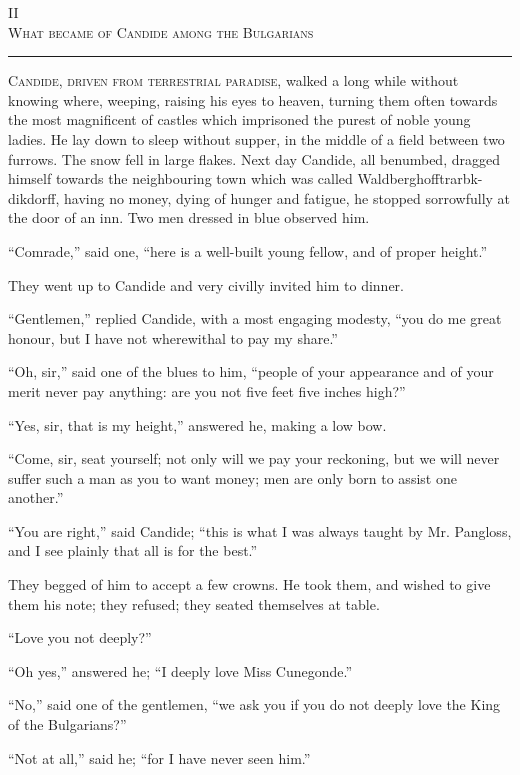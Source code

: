 \begin{center}
II\\
\textsc{What became of Candide among the Bulgarians}
\end{center}
\vspace{-0.5cm}
\rule{\textwidth}{0.5pt}
\lettrine{C}{andide, driven from terrestrial paradise}, walked a long while without knowing where, weeping, raising his eyes to heaven, turning them often towards the most magnificent of castles which imprisoned the purest of noble young ladies. He lay down to sleep without supper, in the middle of a field between two furrows. The snow fell in large flakes. Next day Candide, all benumbed, dragged himself towards the neighbouring town which was called Waldberghofftrarbk-dikdorff, having no money, dying of hunger and fatigue, he stopped sorrowfully at the door of an inn. Two men dressed in blue observed him.

``Comrade,'' said one, ``here is a well-built young fellow, and of proper height.''

They went up to Candide and very civilly invited him to dinner.

``Gentlemen,'' replied Candide, with a most engaging modesty, ``you do me great honour, but I have not wherewithal to pay my share.''

``Oh, sir,'' said one of the blues to him, ``people of your appearance and of your merit never pay anything: are you not five feet five inches high?''

``Yes, sir, that is my height,'' answered he, making a low bow.

``Come, sir, seat yourself; not only will we pay your reckoning, but we will never suffer such a man as you to want money; men are only born to assist one another.''

``You are right,'' said Candide; ``this is what I was always taught by Mr. Pangloss, and I see plainly that all is for the best.''

They begged of him to accept a few crowns. He took them, and wished to give them his note; they refused; they seated themselves at table.

``Love you not deeply?''

``Oh yes,'' answered he; ``I deeply love Miss Cunegonde.''

``No,'' said one of the gentlemen, ``we ask you if you do not deeply love the King of the Bulgarians?''

``Not at all,'' said he; ``for I have never seen him.''

